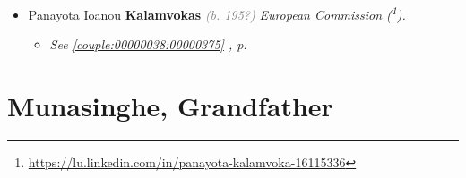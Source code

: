 \documentclass[10pt, openany]{book}
\begin{document}
\begin{itemize}
{\begin{itemize}
{\begin{itemize}
{\begin{itemize}
{\begin{itemize}
{\begin{itemize}
\item{XristinaAlexandra \textbf{Kalamvoka} \textcolor{gray}{\textit{(b. 198?)}}
 }
\item{Ioannis Giorgiou \textbf{Kalamvokas} \textcolor{gray}{\textit{(b. 198?)}} \textcolor{slmaroon}{\textit{Cousin.}}
  }
\end{itemize}}
\end{itemize}
  }
\item{Panayota Ioanou \textbf{Kalamvokas} \textcolor{gray}{\textit{(b. 195?)}} \textcolor{slmaroon}{\textit{European Commission (\footnote{\url{https://lu.linkedin.com/in/panayota-kalamvoka-16115336}}).}}
\begin{itemize}
\item{\textcolor{slteal}{\textit{See  \autoref{couple:00000038:00000375} \textit{, p. \pageref{couple:00000038:00000375} }}}}
\end{itemize}
  }
\end{itemize}}
\end{itemize}
   }
\end{itemize}}
\end{itemize}
  
\part{Munasinghe, Grandfather}
\end{document}
